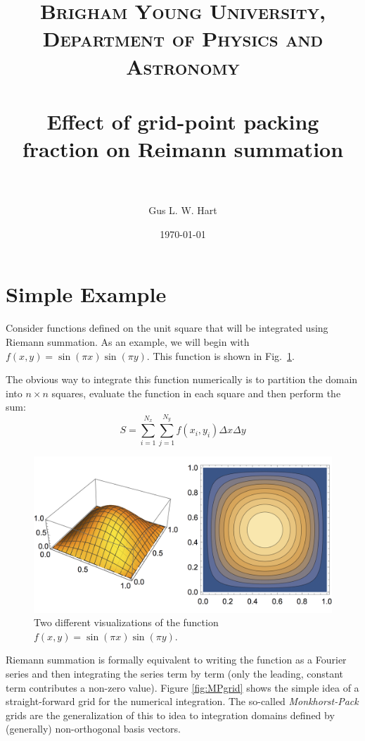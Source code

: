 \documentclass[fontsize=11pt]{scrartcl}
\title{	
\normalfont \normalsize 
\textsc{Brigham Young University, Department of Physics and Astronomy} \\ [25pt] %
\horrule{0.5pt} \\[0.4cm] %
\huge Effect of grid-point packing fraction on Reimann summation \\ %
\horrule{2pt} \\[0.5cm] %
}
\author{Gus L. W. Hart} %
\date{\normalsize\today} %
\numberwithin{equation}{section} %
\numberwithin{figure}{section} %
\numberwithin{table}{section} %
\begin{document}
\maketitle %


\section{Simple Example}
Consider functions defined on the unit square that will be integrated using Riemann summation. As an
example, we will begin with $f(x,y)=\sin(\pi x)\sin(\pi y)$. This function is shown in
Fig.~\ref{fig:hump}.

The obvious way to integrate this function numerically is to partition the domain into $n\times n$
squares, evaluate the function in each square and then perform the sum: 
$$
S=\sum_{i=1}^{N_x}\sum_{j=1}^{N_y}f(x_i,y_i)\Delta x\Delta y
$$
\begin{figure}
\includegraphics[width=.75\linewidth]{figs/hump.png}
\caption{Two different visualizations of the function $f(x,y)=\sin(\pi x)\sin(\pi y)$.\label{fig:hump}}
\end{figure}
Riemann summation is formally equivalent to writing the function as a Fourier series and then
integrating the series term by term (only the leading, constant term contributes a non-zero value).   
Figure \ref{fig:MPgrid} shows the simple idea of a straight-forward grid for the numerical
integration. The so-called \emph{Monkhorst-Pack} grids are the generalization of this to idea to
integration domains defined by (generally) non-orthogonal basis vectors. 
\end{document}
